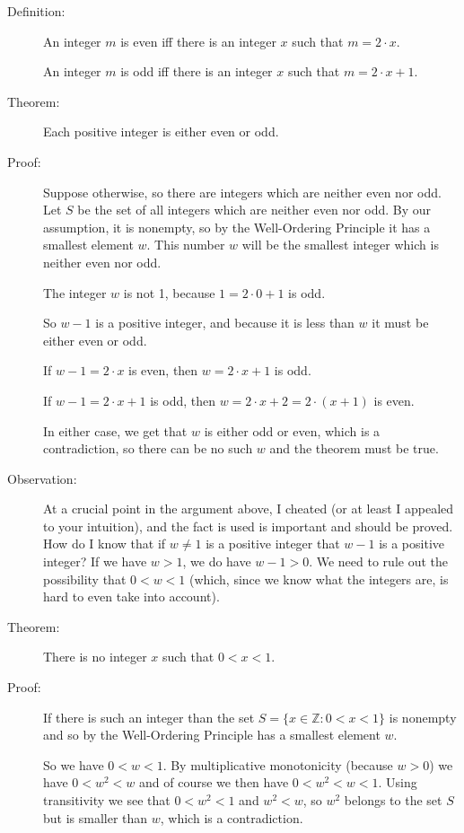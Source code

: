 \documentclass[12pt]{article}
\begin{document}
\begin{description}

\item[Definition:]  An integer $m$ is even iff there is an integer $x$ such that $m=2\cdot x$.  

An integer $m$ is odd iff there is an integer $x$ such that $m=2\cdot x +1$.

\item[Theorem:]  Each positive integer is either even or odd.

\item[Proof:]  Suppose otherwise, so there are integers which are neither even nor odd.  Let $S$ be the set of all integers which are neither even nor odd.  By our assumption, it is nonempty, so by the Well-Ordering Principle it has a smallest element $w$.  This number $w$ will be the smallest integer which is neither even nor odd.

The integer $w$ is not 1, because $1 = 2\cdot 0 +1$ is odd.

So $w-1$ is a positive integer, and because it is less than $w$ it must be either even or odd.

If $w-1=2\cdot x$ is even, then $w=2\cdot x +1$ is odd.

If $w-1=2\cdot x +1$ is odd, then $w = 2 \cdot x +2 = 2 \cdot(x+1)$ is even.

In either case, we get that $w$ is either odd or even, which is a contradiction, so there can be no such $w$ and the theorem must be true.

\item[Observation:]  At a crucial point in the argument above, I cheated (or at least I appealed to your intuition), and the fact is used is important and should be proved.  How do I know that if $w\neq 1$ is a positive integer that $w-1$ is a positive integer?
If we have $w>1$, we do have $w-1>0$.  We need to rule out the possibility that $0<w<1$ (which, since we know what the integers are, is hard to even take into account).

\item[Theorem:]  There is no integer $x$ such that $0<x<1$.

\item[Proof:]  If there is such an integer than the set $S = \{x \in {\mathbb Z}:0<x<1\}$ is nonempty and so by the Well-Ordering Principle has a smallest element $w$.

So we have $0<w<1$.  By multiplicative monotonicity (because $w>0$) we have $0<w^2<w$ and of course
we then have $0<w^2<w<1$.  Using transitivity we see that $0<w^2<1$ and $w^2<w$, so $w^2$ belongs to the set
$S$ but is smaller than $w$, which is a contradiction.


\end{description}
\end{document}
